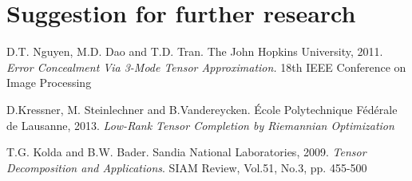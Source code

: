 \documentclass[a4paper, 11pt]{article} %
\begin{document}
\section{Suggestion for further research}

\begin{thebibliography}{9}

D.T. Nguyen, M.D. Dao and T.D. Tran. {The John Hopkins University}, 2011.
\textit{Error Concealment Via 3-Mode Tensor Approximation.} 18th IEEE Conference on Image Processing


D.Kressner, M. Steinlechner and B.Vandereycken.{ \'Ecole Polytechnique F\'ed\'erale de Lausanne}, 2013. \textit{Low-Rank Tensor Completion by Riemannian Optimization}


  T.G. Kolda and B.W. Bader. {Sandia National Laboratories}, 2009.
\textit{Tensor Decomposition and Applications}. SIAM Review, Vol.51, No.3, pp. 455-500
\end{thebibliography}

%
%
%
\end{document}
